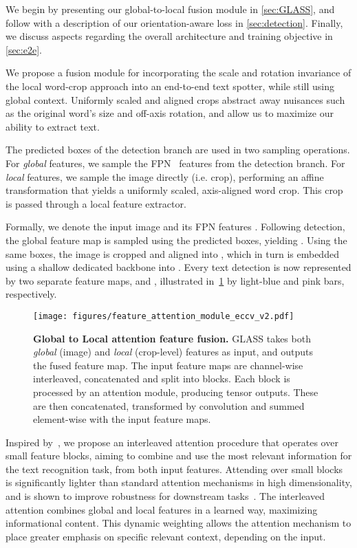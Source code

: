 \documentclass[runningheads]{llncs}
\begin{document}
We begin by presenting our global-to-local fusion module in \cref{sec:GLASS}, 
and follow with a description of our orientation-aware loss in \cref{sec:detection}.
Finally, we discuss aspects regarding the overall architecture and training objective in \cref{sec:e2e}.



We propose a fusion module for incorporating the scale and rotation invariance of the local word-crop approach into an end-to-end text spotter, while still using global context.
Uniformly scaled and aligned crops abstract away nuisances such as the original word's size and off-axis rotation, and allow us to maximize our ability to extract text.

The predicted boxes of the detection branch are used in two sampling operations.
For \emph{global} features, we sample the FPN~\cite{lin2017feature} features from the detection branch.
For \emph{local} features, we sample the image directly (i.e. crop), performing an affine transformation that yields a uniformly scaled, axis-aligned word crop.
This crop is passed through a local feature extractor. 

Formally, we denote the input image  and its FPN features .
Following detection, the global feature map  is sampled using the predicted boxes, yielding .
Using the same boxes, the image  is cropped and aligned into , which in turn is embedded using a shallow dedicated backbone into .
Every text detection is now represented by two separate feature maps,  and  ,
illustrated in~\cref{fig:featrefusion} by light-blue and pink bars, respectively.

\begin{figure}[t]
 \centering
  \texttt{[image: figures/feature\_attention\_module\_eccv\_v2.pdf]}
\caption{\textbf{Global to Local attention feature fusion.} GLASS takes both \emph{global} (image) and \emph{local} (crop-level) features as input, and outputs the fused feature map.
The input feature maps are channel-wise interleaved, concatenated and split into  blocks. Each block is processed by an attention module, producing  tensor outputs. These are then concatenated, transformed by  convolution and summed element-wise with the input feature maps.
  }
  \label{fig:featrefusion}
\end{figure}

Inspired by~\cite{lu2021master}, we propose an interleaved attention procedure that operates over small feature blocks, aiming to combine and use the most relevant information for the text recognition task, from both input features.
Attending over small blocks is significantly lighter than standard attention mechanisms in high dimensionality, and is shown to improve robustness for downstream tasks~\cite{lu2021master}.
The interleaved attention combines global and local features in a learned way, maximizing informational content.
This dynamic weighting allows the attention mechanism to place greater emphasis on specific relevant context, depending on the input.
\end{document}

